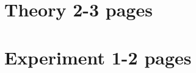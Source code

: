\documentclass[a4paper]{article}
\begin{document}
\section{Theory 2-3 pages}
\label{sec:theory}


\begin{comment} %
\subsection{Two-dimensional Electron Gas}
Here, explain the concept of a 2-DEG in GaAs/AlGaAs. What is a 2-DEG and why does it arise?

\subsection{Hall Effect}
Explain the classical Hall effect in your own words. What do I measure at $B=0$? And what happens if $B>0$? Which effect gives rise to the voltage drop in the vertical direction?

\subsection{Quantum Hall Effect}
Explain the IQHE in your own words. What does the density of states look like in a 2-DEG when $B=0$? What are Landau levels and how do they arise? What are edge states? What does the electron transport look like when you change the magnetic field? What do you expect to measure?

\end{comment}
\section{Experiment 1-2 pages}
\begin{comment} %
\subsection{Fabrication}
Explain a step-by-step recipe for fabrication here. How long did you etch and why? What is an Ohmic contact?
\subsection{Experimental set-up}
Explain the experimental set-up here. Use a schematic picture (make it yourself in photoshop, paint, ...) to show how the components are connected. Briefly explain how a lock-in amplifier works.

\end{comment} %
\end{document}

